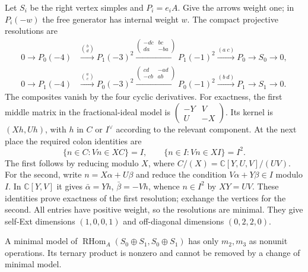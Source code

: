 Let $S_i$ be the right vertex simples and $P_i=e_iA$.  Give the arrows
weight one; in $P_i(-w)$ the free generator has internal weight $w$.
The compact projective resolutions are
\begin{equation}\label{cyquant:eq:conifold-resolutions}
 \begin{aligned}
 0\to P_0(-4)&\xrightarrow{\binom bd}P_1(-3)^2
 \xrightarrow{\left(\begin{smallmatrix}-dc&bc\\da&-ba\end{smallmatrix}\right)}
 P_1(-1)^2\xrightarrow{(a\ c)}P_0\to S_0\to0,\\
 0\to P_1(-4)&\xrightarrow{\binom ac}P_0(-3)^2
 \xrightarrow{\left(\begin{smallmatrix}cd&-ad\\-cb&ab\end{smallmatrix}\right)}
 P_0(-1)^2\xrightarrow{(b\ d)}P_1\to S_1\to0.
 \end{aligned}
\end{equation}
The composites vanish by the four cyclic derivatives.  For exactness,
the first middle matrix in the fractional-ideal model is
$\left(\begin{smallmatrix}-Y&V\\U&-X\end{smallmatrix}\right)$.
Its kernel is $(Xh,Uh)$, with $h$ in $C$ or $I^\vee$ according to
the relevant component.  At the next place the required colon identities
are
\[
 \{n\in C:Vn\in XC\}=I,\qquad
 \{n\in I:Vn\in XI\}=I^2.
\]
The first follows by reducing modulo $X$, where
$C/(X)=\mathbb C[Y,U,V]/(UV)$.  For the second, write
$n=X\alpha+U\beta$ and reduce the condition
$V\alpha+Y\beta\in I$ modulo $I$.  In $\mathbb C[Y,V]$ it gives
$\bar\alpha=Yh$, $\bar\beta=-Vh$, whence $n\in I^2$ by $XY=UV$.
These identities prove exactness of the first resolution; exchange the
vertices for the second.  All entries have positive weight, so the
resolutions are minimal.  They give self-Ext dimensions $(1,0,0,1)$
and off-diagonal dimensions $(0,2,2,0)$.

\begin{proposition}\label{cyquant:prop:conifold-ternary}
A minimal model of
$\operatorname{RHom}_A(S_0\oplus S_1,S_0\oplus S_1)$ has only
$m_2,m_3$ as nonunit operations.  Its ternary product is nonzero and
cannot be removed by a change of minimal model.
\end{proposition}

